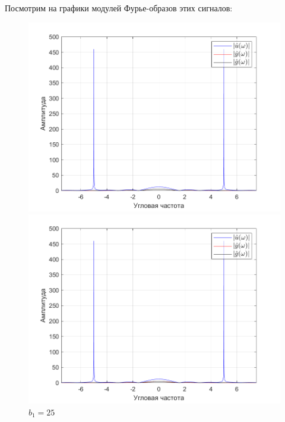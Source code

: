 \documentclass[a4paper]{article}
\begin{document}
Посмотрим на графики модулей Фурье-образов этих сигналов:

\begin{figure}[H]
    \begin{minipage}{0.5\textwidth}
        \centering
        \includegraphics[width=\linewidth]{ex1_2/a1=0_a2=25_b1=10.5_b2=25_d=5/h4.png}
        \caption{$b_1=10.5$}
    \end{minipage}
    \begin{minipage}{0.5\textwidth}
        \centering
        \includegraphics[width=\linewidth]{ex1_2/a1=0_a2=25_b1=25_b2=25_d=5/h4.png}
        \caption{$b_1=25$}
    \end{minipage}
\end{figure}
\end{document}
